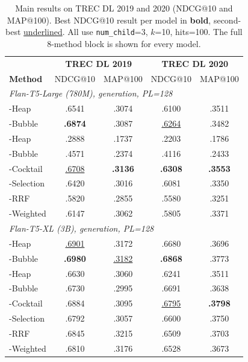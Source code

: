\begin{table}[!htbp]
\caption{Main results on TREC DL 2019 and 2020 (NDCG@10 and MAP@100). Best NDCG@10 result per model in \textbf{bold}, second-best \underline{underlined}. All use \texttt{num\_child}=3, $k$=10, hits=100. The full 8-method block is shown for every model.}
\label{tab:main}
\scriptsize
\setlength{\tabcolsep}{4pt}
\renewcommand{\arraystretch}{0.92}
\begin{tabular}{l|cc|cc}
\toprule
& \multicolumn{2}{c|}{\textbf{TREC DL 2019}} & \multicolumn{2}{c}{\textbf{TREC DL 2020}} \\
\textbf{Method} & NDCG@10 & MAP@100 & NDCG@10 & MAP@100 \\
\midrule
\multicolumn{5}{l}{\textit{Flan-T5-Large (780M), generation, PL=128}} \\
\topdown{}-Heap & .6541 & .3074 & .6100 & .3511 \\
\topdown{}-Bubble & \textbf{.6874} & .3087 & \underline{.6264} & .3482 \\
\bottomup{}-Heap & .2888 & .1737 & .2203 & .1786 \\
\bottomup{}-Bubble & .4571 & .2374 & .4116 & .2433 \\
\dualend{}-Cocktail & \underline{.6708} & \textbf{.3136} & \textbf{.6308} & \textbf{.3553} \\
\dualend{}-Selection & .6420 & .3016 & .6081 & .3350 \\
\bidir{}-RRF & .5820 & .2855 & .5580 & .3251 \\
\bidir{}-Weighted & .6147 & .3062 & .5805 & .3371 \\
\midrule
\multicolumn{5}{l}{\textit{Flan-T5-XL (3B), generation, PL=128}} \\
\topdown{}-Heap & \underline{.6901} & .3172 & .6680 & .3696 \\
\topdown{}-Bubble & \textbf{.6980} & \underline{.3182} & \textbf{.6868} & .3773 \\
\bottomup{}-Heap & .6630 & .3060 & .6241 & .3511 \\
\bottomup{}-Bubble & .6730 & .2995 & .6691 & .3638 \\
\dualend{}-Cocktail & .6884 & .3095 & \underline{.6795} & \textbf{.3798} \\
\dualend{}-Selection & .6792 & .3057 & .6600 & .3750 \\
\bidir{}-RRF & .6845 & .3215 & .6509 & .3703 \\
\bidir{}-Weighted & .6810 & .3176 & .6528 & .3673 \\
\midrule

\end{tabular}
\end{table}
